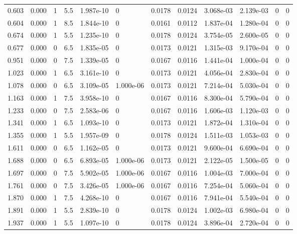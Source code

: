 \documentclass[preview]{standalone}
\begin{document}
{{\begin{tabular}{L{1.2cm}C{1.2cm} C{0.3cm}C{0.5cm} C{1.4cm}C{1.4cm} C{1.4cm}C{1.4cm} C{1.6cm}C{1.6cm} C{1.6cm}C{1.6cm}}
  0.603  &  0.000  & 1     & 5.5 &  1.987e-10  & 0  &  0.0178&   0.0124& 3.068e-03 & 2.139e-03   &  0 & 0  \\ 
  0.604  &  0.000  & 1     & 8.5 &  1.844e-10  & 0  &  0.0161&   0.0112& 1.837e-04 & 1.280e-04   &  0 & 0  \\ 
  0.674  &  0.000  & 1     & 5.5 &  1.235e-10  & 0  &  0.0178&   0.0124& 3.754e-05 & 2.600e-05   &  0 & 0  \\ 
  0.677  &  0.000  & 0     & 6.5 &  1.835e-05  & 0  &  0.0173&   0.0121& 1.315e-03 & 9.170e-04   &  0 & 0  \\ 
  0.951  &  0.000  & 0     & 7.5 &  1.339e-05  & 0  &  0.0167&   0.0116& 1.441e-04 & 1.000e-04   &  0 & 0  \\ 
  1.023  &  0.000  & 1     & 6.5 &  3.161e-10  & 0  &  0.0173&   0.0121& 4.056e-04 & 2.830e-04   &  0 & 0  \\ 
  1.078  &  0.000  & 0     & 6.5 &  3.109e-05  & 1.000e-06  &  0.0173&   0.0121& 7.214e-04 & 5.030e-04   &  0 & 0  \\ 
  1.163  &  0.000  & 1     & 7.5 &  3.958e-10  & 0  &  0.0167&   0.0116& 8.300e-04 & 5.790e-04   &  0 & 0  \\ 
  1.233  &  0.000  & 0     & 7.5 &  2.583e-06  & 0  &  0.0167&   0.0116& 1.606e-03 & 1.120e-03   &  0 & 0  \\ 
  1.341  &  0.000  & 1     & 6.5 &  1.093e-10  & 0  &  0.0173&   0.0121& 1.872e-04 & 1.310e-04   &  0 & 0  \\ 
  1.355  &  0.000  & 1     & 5.5 &  1.957e-09  & 0  &  0.0178&   0.0124& 1.511e-03 & 1.053e-03   &  0 & 0  \\ 
  1.611  &  0.000  & 0     & 6.5 &  1.162e-05  & 0  &  0.0173&   0.0121& 9.600e-04 & 6.690e-04   &  0 & 0  \\ 
  1.688  &  0.000  & 0     & 6.5 &  6.893e-05  & 1.000e-06  &  0.0173&   0.0121& 2.122e-05 & 1.500e-05   &  0 & 0  \\ 
  1.697  &  0.000  & 0     & 7.5 &  5.902e-05  & 1.000e-06  &  0.0167&   0.0116& 1.004e-03 & 7.000e-04   &  0 & 0  \\ 
  1.761  &  0.000  & 0     & 7.5 &  3.426e-05  & 1.000e-06  &  0.0167&   0.0116& 7.254e-04 & 5.060e-04   &  0 & 0  \\ 
  1.870  &  0.000  & 1     & 7.5 &  4.268e-10  & 0  &  0.0167&   0.0116& 7.941e-04 & 5.540e-04   &  0 & 0  \\ 
  1.891  &  0.000  & 1     & 5.5 &  2.839e-10  & 0  &  0.0178&   0.0124& 1.002e-03 & 6.980e-04   &  0 & 0  \\ 
  1.937  &  0.000  & 1     & 5.5 &  1.097e-10  & 0  &  0.0178&   0.0124& 3.896e-04 & 2.720e-04   &  0 & 0  \\ 

\end{tabular}}}
\end{document}

